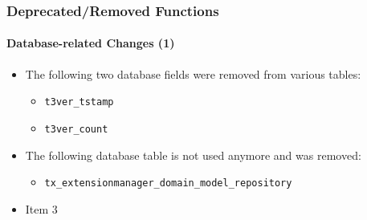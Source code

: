 %

\begin{frame}[fragile]
	\frametitle{Deprecated/Removed Functions}
	\framesubtitle{Database-related Changes (1)}

	\begin{itemize}
		\item The following two database fields were removed from various tables:
			\begin{itemize}\smaller
				\item \texttt{t3ver\_tstamp}
				\item \texttt{t3ver\_count}
			\end{itemize}\normalsize
			\vspace{0.4cm}

		\item The following database table is not used anymore and was removed:
			\begin{itemize}\smaller
				\item \texttt{tx\_extensionmanager\_domain\_model\_repository}
			\end{itemize}\normalsize
			\vspace{0.4cm}

		\item Item 3
	\end{itemize}

\end{frame}


